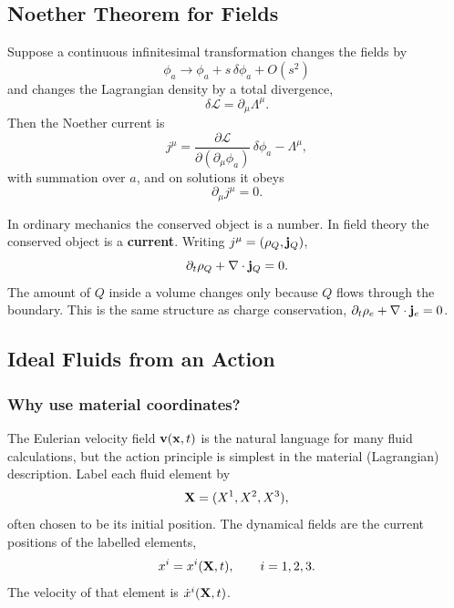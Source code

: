 \documentclass[../main.tex]{subfiles}
\begin{document}
\subsection{Noether Theorem for Fields}
Suppose a continuous infinitesimal transformation changes the fields by
\begin{equation}
  \phi_a\longrightarrow \phi_a+s\,\delta\phi_a+O(s^2)
\end{equation}
and changes the Lagrangian density by a total divergence,
\begin{equation}
  \delta\mathcal L=\partial_\mu\Lambda^\mu .
  \label{eq:lec23_field_noether_condition}
\end{equation}
Then the Noether current is
\begin{equation}
  \boxed{j^\mu=\frac{\partial\mathcal L}{\partial(\partial_\mu\phi_a)}\,
  \delta\phi_a-\Lambda^\mu,}
  \label{eq:lec23_noether_current}
\end{equation}
with summation over $a$, and on solutions it obeys
\begin{equation}
  \boxed{\partial_\mu j^\mu=0.}
  \label{eq:lec23_current_conservation}
\end{equation}

In ordinary mechanics the conserved object is a number.  In field theory the
conserved object is a \textbf{current}.  Writing $j^\mu=(\rho_Q,\mathbf{j}_Q)$,
\begin{equation}
  \partial_t\rho_Q+\nabla \cdot\mathbf{j}_Q=0.
\end{equation}
The amount of $Q$ inside a volume changes only because $Q$ flows through the
boundary.  This is the same structure as charge conservation,
$\partial_t\rho_e+\nabla \cdot\mathbf{j}_e=0$.

\subsection{Ideal Fluids from an Action}

\subsubsection*{Why use material coordinates?}
The Eulerian velocity field $\mathbf{v}(\mathbf{x},t)$ is the natural language for many
fluid calculations, but the action principle is simplest in the material
(Lagrangian) description.  Label each fluid element by
\begin{equation}
  \mathbf{X}=(X^1,X^2,X^3),
\end{equation}
often chosen to be its initial position.  The dynamical fields are the current
positions of the labelled elements,
\begin{equation}
  x^i=x^i(\mathbf{X},t),\qquad i=1,2,3.
\end{equation}
The velocity of that element is $\dot x^i(\mathbf{X},t)$.
\end{document}
